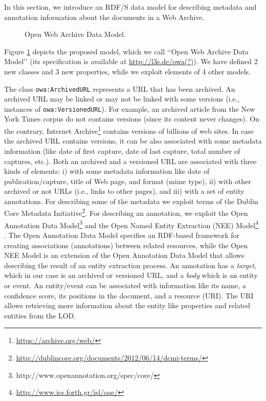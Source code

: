 \documentclass[runningheads,a4paper]{libtex/llncs}
\newcommand{\q}[1]{\lq\lq{}{}#1\rq\rq{}{}}
\begin{document}
In this section, we introduce an RDF/S data model
for describing metadata and annotation information about the documents in a Web Archive.

\begin{figure}[htbp]
\vspace{-1mm}
\centerline{}
\vspace{-1mm}
\caption{Open Web Archive Data Model.}
\label{fig:owa}
\vspace{-3mm}
\end{figure}

Figure \ref{fig:owa} depicts the proposed model, which we call \q{Open Web Archive Data Model}
(its specification is available at \url{http://l3s.de/owa(?)}).
We have defined 2 new classes and 3 new properties,
while we exploit elements of 4 other models.

The class {\tt owa:ArchivedURL} represents a URL that has been archived.
An archived URL may be linked or may not be linked with some versions
(i.e., instances of {\tt owa:VersionedURL}).
For example, an archived article from the
New York Times corpus \cite{sandhaus2008new} do not contains versions
(since its content never changes).
On the contrary,
Internet Archive\footnote{\url{https://archive.org/web/}}
contains versions of billions of web sites.
In case the archived URL contains versions,
it can be also associated with some metadata information
(like date of first capture, date of last capture, total number of captures, etc.).
%
Both an archived and a versioned URL
are associated with three kinds of elements:
i) with some metadata information like date of publication/capture,
title of Web page, and format (mime type),
ii) with other archived or not URLs (i.e., links to other pages), and
iii) with a set of entity annotations.
%
For describing some of the metadata we exploit terms of the
Dublin Core Metadata Initiative\footnote{\url{http://dublincore.org/documents/2012/06/14/dcmi-terms/}}.
For describing an annotation, we exploit
the Open Annotation Data Model\footnote{http://www.openannotation.org/spec/core/} \cite{sanderson2013open}
and the Open Named Entity Extraction (NEE) Model\footnote{\url{http://www.ics.forth.gr/isl/oae/}} \cite{fafalios2015ijait}.
The Open Annotation Data Model specifies an RDF-based framework for creating associations (annotations)
between related resources, while the Open NEE Model is an extension of the Open Annotation Data Model
that allows describing the result of an entity extraction process.
%
An annotation has a {\em target}, which in our case is an archived or versioned URL, and
a {\em body} which is an entity or event.
An entity/event can be associated with information like
its name, a confidence score, its positions in the document, and a resource (URI).
The URI allows retrieving more information about the entity
like properties and related entities from the LOD.
\end{document}
